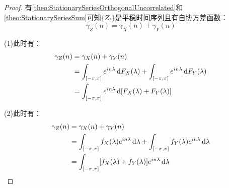 \begin{proof}
	有\cref{theo:StationarySeriesOrthogonalUncorrelated}和\cref{theo:StationarySeriesSum}可知$\{Z_t\}$是平稳时间序列且有自协方差函数：
	\begin{equation*}
		\gamma_Z(n)=\gamma_X(n)+\gamma_Y(n)
	\end{equation*}\par
	(1)此时有：
	\begin{align*}
		\gamma_Z(n)&=\gamma_X(n)+\gamma_Y(n) \\
		&=\int_{[-\pi,\pi]}e^{in\lambda}\mathop{}\!\mathrm{d} F_X(\lambda)+\int_{[-\pi,\pi]}e^{in\lambda}\mathop{}\!\mathrm{d} F_Y(\lambda) \\
		&=\int_{[-\pi,\pi]}e^{in\lambda}\mathop{}\!\mathrm{d} [F_X(\lambda)+F_Y(\lambda)]
	\end{align*}\par
	(2)此时有：
	\begin{align*}						     \gamma_Z(n)&=\gamma_X(n)+\gamma_Y(n) \\
		&=\int_{[-\pi,\pi]}f_X(\lambda)e^{in\lambda}\mathop{}\!\mathrm{d}\lambda+\int_{[-\pi,\pi]}f_Y(\lambda)e^{in\lambda}\mathop{}\!\mathrm{d}\lambda \\
		&=\int_{[-\pi,\pi]}[f_X(\lambda)+f_Y(\lambda)]e^{in\lambda}\mathop{}\!\mathrm{d}\lambda\qedhere
	\end{align*}
\end{proof}
